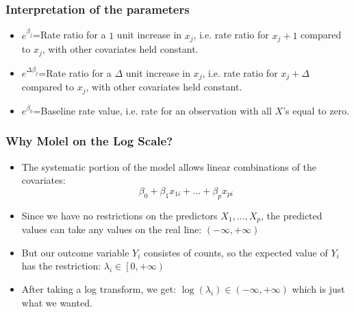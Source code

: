 \documentclass[10pt,xcolor={svgnames},t]{beamer}
\begin{document}
%
%
\begin{frame}
	\frametitle{Interpretation of the parameters}
	
	\begin{itemize}
		\item $e^{\beta_j}$=Rate ratio for a $1$ unit increase in $x_j$, i.e. rate ratio for $x_j +1$ compared to $x_j$, with other covariates held constant.
		\bigskip
		\item $e^{\Delta\beta_j}$=Rate ratio for a $\Delta$ unit increase in $x_j$, i.e. rate ratio for $x_j +\Delta$ compared to $x_j$, with other covariates held constant.
		\bigskip
		\item $e^{\beta_0}$=Baseline rate value, i.e. rate for an observation with all $X$'s equal to zero.
	\end{itemize}
	
	
\end{frame}
%
%
\begin{frame}
	\frametitle{Why Molel on the Log Scale?}
	
	\begin{itemize}
		\item The systematic portion of the model allows linear combinations of the covariates:
		\[ \beta_0 + \beta_1 x_{1i} + \ldots +\beta_p x_{pi}
		\]
		
		\item Since we have no restrictions on the predictors $X_1 , \ldots, X_p$, the predicted values can take any values on the real line: $(-\infty, +\infty)$
		\bigskip
		\item But our outcome variable $Y_i$ consistes of counts, so the expected value of $Y_i$ has the restriction: $\lambda_i \in \left[0, +\infty\right)$
		\bigskip
		\item After taking a log transform, we get: $\log(\lambda_i) \in (-\infty, +\infty)$ which is just what we wanted.
	\end{itemize}
	
	
\end{frame}
%
%
\end{document}
